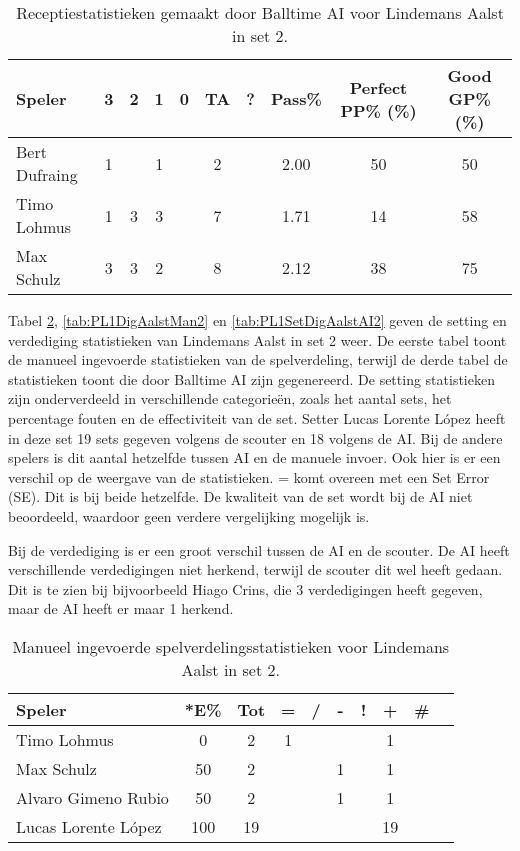 \begin{table}[ht!]
  \centering
  \scriptsize
  \begin{tabular}{|l|c|c|c|c|c|c|c|c|c|} \hline
    \textbf{Speler} & 3 & 2 & 1 & 0 & TA & ? & Pass\% & Perfect PP\% (\%) & Good GP\% (\%) \\ \hline
    Bert Dufraing & 1 &  & 1 &  & 2 &  & 2.00 & 50 & 50 \\
    Timo Lohmus & 1 & 3 & 3 &  & 7 &  & 1.71 & 14 & 58 \\
    Max Schulz & 3 & 3 & 2 &  & 8 &  & 2.12 & 38 & 75 \\  \hline
  \end{tabular}
  \caption[Receptiestatistieken gemaakt door Balltime AI voor Lindemans Aalst in set 2]{\label{tab:PL1ReceiveAalstAI2}Receptiestatistieken gemaakt door Balltime AI voor Lindemans Aalst in set 2.}
\end{table}

Tabel \ref{tab:PL1SetAalstMan2}, \ref{tab:PL1DigAalstMan2} en \ref{tab:PL1SetDigAalstAI2} geven de setting en verdediging statistieken van Lindemans Aalst in set 2 weer. De eerste tabel toont de manueel ingevoerde statistieken van de spelverdeling, terwijl de derde tabel de statistieken toont die door Balltime AI zijn gegenereerd. De setting statistieken zijn onderverdeeld in verschillende categorieën, zoals het aantal sets, het percentage fouten en de effectiviteit van de set. Setter Lucas Lorente López heeft in deze set 19 sets gegeven volgens de scouter en 18 volgens de AI. Bij de andere spelers is dit aantal hetzelfde tussen AI en de manuele invoer. Ook hier is er een verschil op de weergave van de statistieken. = komt overeen met een Set Error (SE). Dit is bij beide hetzelfde. De kwaliteit van de set wordt bij de AI niet beoordeeld, waardoor geen verdere vergelijking mogelijk is.

Bij de verdediging is er een groot verschil tussen de AI en de scouter. De AI heeft verschillende verdedigingen niet herkend, terwijl de scouter dit wel heeft gedaan. Dit is te zien bij bijvoorbeeld Hiago Crins, die 3 verdedigingen heeft gegeven, maar de AI heeft er maar 1 herkend.

\begin{table}[ht!]
  \centering
  \scriptsize
    \begin{tabular}{|l|c|c|c|c|c|c|c|c|c|} \hline
      \textbf{Speler} & *E\% & Tot & = & / & - & ! & + & \# \\ \hline
      Timo Lohmus & 0 & 2 & 1 &  &  &  & 1 &   \\
      Max Schulz & 50 & 2 &  &  & 1 & & 1 &  \\
      Alvaro Gimeno Rubio  & 50 & 2 &  &  & 1 &  & 1 &   \\ 
      Lucas Lorente López  & 100 & 19 &  &  &  &  & 19 &  \\ \hline
  \end{tabular}
  \caption[Manueel ingevoerde spelverdelingsstatistieken voor Lindemans Aalst in set 2]{\label{tab:PL1SetAalstMan2}Manueel ingevoerde spelverdelingsstatistieken voor Lindemans Aalst in set 2.}
\end{table}

